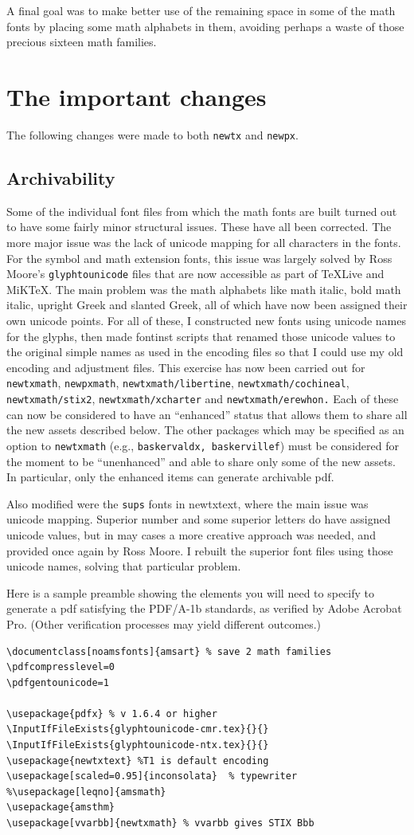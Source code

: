 \documentclass[\fsc]{article}
\theoremstyle{oldplain}
\theoremstyle{plain}
\begin{document}
A final goal was to make better use of the remaining space in some of the math fonts by placing some math alphabets in them, avoiding perhaps a waste of those precious sixteen math families.
\section{The important changes}
The following changes were made to both {\tt newtx} and {\tt newpx}.
\subsection{Archivability}
Some of the individual font files from which the math fonts are built turned out to have some fairly minor structural issues. These have all been corrected. The more major issue was the lack of unicode mapping for all characters in the fonts. For the symbol and math extension fonts, this issue was largely solved by Ross Moore's {\tt glyphtounicode} files that are now accessible as part of TeXLive and MiKTeX. The main problem was the math alphabets like math italic, bold math italic, upright Greek and slanted Greek, all of which have now been assigned their own unicode points. For all of these, I constructed new fonts using unicode names for the glyphs, then made \textsf{fontinst} scripts that renamed those unicode values to the original simple names as used in the encoding files so that I could use my old encoding and adjustment files. This exercise has now been carried out for {\tt newtxmath}, {\tt newpxmath}, {\tt newtxmath/libertine}, {\tt newtxmath/cochineal}, {\tt newtxmath/stix2}, {\tt newtxmath/xcharter} and {\tt newtxmath/erewhon.} Each of these can now be considered to have an ``enhanced'' status that allows them to share all the new assets described below. 
 The other packages which may be specified as an option to {\tt newtxmath} (e.g., {\tt baskervaldx, baskervillef}) must be considered for the moment to be ``unenhanced'' and able to share only some of the new assets. In particular, only the enhanced items can generate archivable pdf. 

Also modified were the {\tt sups} fonts in {newtxtext}, where the main issue was unicode mapping. Superior number and some superior letters do have assigned unicode values, but in may cases a more creative approach was needed, and provided once again by Ross Moore. I rebuilt the superior font files using those unicode names, solving that particular problem.

Here is a sample  preamble showing the elements you will need to specify to generate a pdf satisfying the PDF/A-1b standards, as verified by Adobe Acrobat Pro. (Other verification processes may yield different outcomes.)
\begin{verbatim}
\documentclass[noamsfonts]{amsart} % save 2 math families 
\pdfcompresslevel=0 
\pdfgentounicode=1 
 
\usepackage{pdfx} % v 1.6.4 or higher
\InputIfFileExists{glyphtounicode-cmr.tex}{}{} 
\InputIfFileExists{glyphtounicode-ntx.tex}{}{}
\usepackage{newtxtext} %T1 is default encoding
\usepackage[scaled=0.95]{inconsolata}  % typewriter
%\usepackage[leqno]{amsmath} 
\usepackage{amsthm}
\usepackage[vvarbb]{newtxmath} % vvarbb gives STIX Bbb
\end{verbatim}
\end{document}
